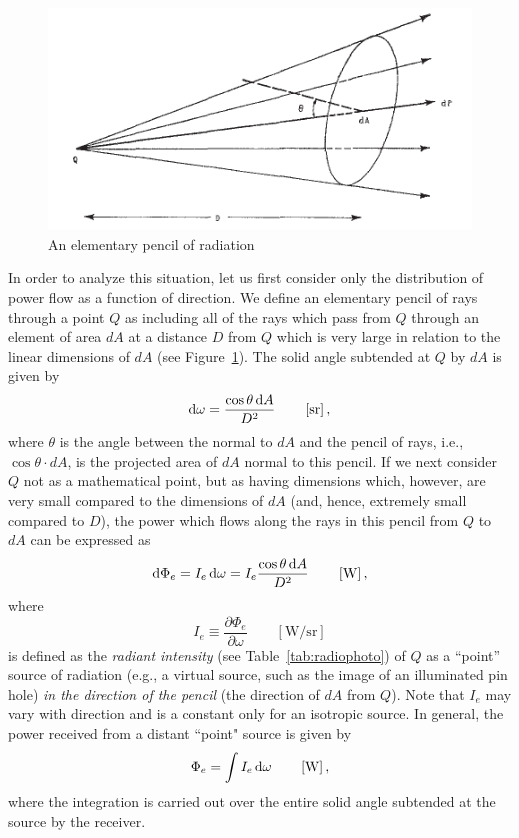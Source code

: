 \begin{figure}
\begin{center}
\includegraphics{figures/nicodemus1963-fig1.pdf}
\end{center}
\caption{An elementary pencil of radiation}
\label{fig:nicodemus1}
\end{figure}

In order to analyze this situation, let us first consider only the distribution
of power flow as a function of direction. We define an elementary pencil of rays
through a point $Q$ as including all of the rays which pass from $Q$ through an
element of area $dA$ at a distance $D$ from $Q$ which is very large in relation
to
the linear dimensions of $dA$ (see Figure~\ref{fig:nicodemus1}).
The solid angle subtended at $Q$ by $dA$ is given by
\begin{equation*}
\d\omega = \frac{\cos\theta \d A}{D^2}
\qquad \left[\si{\steradian}\right],
\end{equation*}
where $\theta$ is the angle between the normal to $dA$ and the pencil of rays,
i.e., $\cos\theta\cdot dA$, is the projected area of $dA$ normal to this pencil.
If we next consider $Q$ not as a mathematical point, but as having dimensions
which, however, are very small compared to the dimensions of $dA$ (and, hence,
extremely small compared to $D$), the power which flows along the rays in this
pencil from $Q$ to $dA$ can be expressed as
\begin{equation*}
\mathop{}\!\mathrm{d}\Phi_e = I_e \mathop{}\!\mathrm{d}\omega = I_e \frac{\cos\theta \mathop{}\!\mathrm{d} A}{D^2}
\qquad \left[\si{\watt}\right],
\end{equation*}
where
\begin{equation}
I_e \equiv \frac{\partial \Phi_e}{\partial \omega}
\qquad \left[\si{\watt\per\steradian}\right]
\end{equation}
is defined as the \textsl{radiant intensity} (see Table~\ref{tab:radiophoto}) of
$Q$ as a “point” source of radiation (e.g., a virtual source, such as the image
of an illuminated pin hole) \emph{in the direction of the pencil} (the direction of
$dA$ from $Q$). Note that $I_e$ may vary with direction and is a constant only
for an isotropic source. In general, the power received from a distant “point"
source is given by
\begin{equation}
\Phi_e = \int I_e \mathop{}\!\mathrm{d}\omega
\qquad \left[\si{\watt}\right],
\end{equation}
where the integration is carried out over the entire solid angle subtended at
the source by the receiver.

